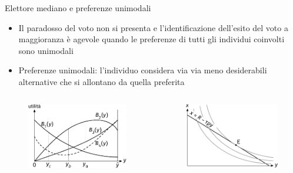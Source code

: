\documentclass[aspectratio=64,11pt]{beamer}
\begin{document}
\begin{frame}{Elettore mediano e preferenze unimodali}
\begin{itemize}
\item Il paradosso del voto non si presenta e l'identificazione dell'esito del
voto a maggioranza è agevole quando le preferenze di tutti gli individui
coinvolti sono \alert{unimodali}
\item \alert{Preferenze unimodali}: l'individuo considera via via meno desiderabili
alternative che si allontano da quella preferita
\end{itemize}
\begin{columns}
\begin{column}{.5\columnwidth}
\begin{figure}[htbp]
\centering
\includegraphics[width=\textwidth]{./figure/elettore-mediano-1.pdf}
\end{figure}
\end{column}
\begin{column}{.5\columnwidth}
\begin{figure}[htbp]
\centering
\includegraphics[width=\textwidth]{./figure/elettore-mediano-3.pdf}
\end{figure}
\end{column}
\end{columns}
\end{frame}
\end{document}
